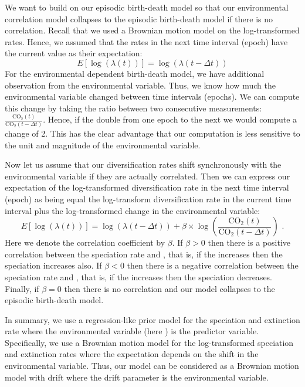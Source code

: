 We want to build on our episodic birth-death model so that our environmental correlation model collapses to the episodic birth-death model if there is no correlation.
Recall that we used a Brownian motion model on the log-transformed rates.
Hence, we assumed that the rates in the next time interval (epoch) have the current value as their expectation:
\begin{equation}
E[\log( \lambda(t) )] = \log( \lambda(t-\Delta t) )
\end{equation}
For the environmental dependent birth-death model, we have additional observation from the environmental variable.
Thus, we know how much the environmental variable changed between time intervals (epochs).
We can compute this change by taking the ratio between two consecutive measurements: $\frac{\text{CO}_2(t)}{\text{CO}_2(t-\Delta t)}$.
Hence, if the \COO double from one epoch to the next we would compute a change of 2.
This has the clear advantage that our computation is less sensitive to the unit and magnitude of the environmental variable.

Now let us assume that our diversification rates shift synchronously with the environmental variable if they are actually correlated.
Then we can express our expectation of the log-transformed diversification rate in the next time interval (epoch) as being equal the log-transform diversification rate in the current time interval plus the log-transformed change in the environmental variable:
\begin{equation}
E[\log( \lambda(t) )] = \log( \lambda(t-\Delta t) ) + \beta \times \log\left( \frac{\text{CO}_2(t)}{\text{CO}_2(t-\Delta t)} \right) \mbox{ .}
\end{equation}
Here we denote the correlation coefficient by $\beta$.
If $\beta > 0$ then there is a positive correlation between the speciation rate and \COO, that is, if the \COO increases then the speciation increases also.
If $\beta < 0$ then there is a negative correlation between the speciation rate and \COO, that is, if the \COO increases then the speciation decreases.
Finally, if $\beta = 0$ then there is no correlation and our model collapses to the episodic birth-death model.

In summary, we use a regression-like prior model for the speciation and extinction rate where the environmental variable (here \COO) is the predictor variable.
Specifically, we use a Brownian motion model for the log-transformed speciation and extinction rates where the expectation depends on the shift in the environmental variable.
Thus, our model can be considered as a Brownian motion model with drift where the drift parameter is the environmental variable.

